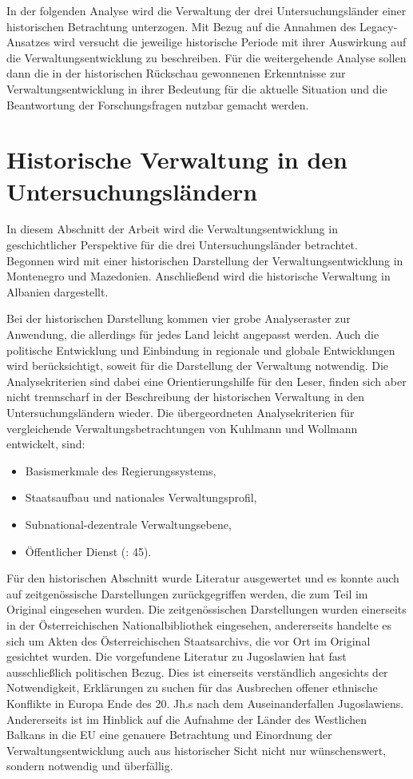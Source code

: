 In der folgenden Analyse wird die Verwaltung der drei Untersuchungsländer einer historischen Betrachtung unterzogen. Mit Bezug auf die Annahmen des Legacy-Ansatzes wird versucht die jeweilige historische Periode mit ihrer Auswirkung auf die Verwaltungsentwicklung zu beschreiben. Für die weitergehende Analyse sollen dann die in der historischen Rückschau gewonnenen Erkenntnisse zur Verwaltungsentwicklung in ihrer Bedeutung für die aktuelle Situation und die Beantwortung der Forschungsfragen nutzbar gemacht werden.

\section{ Historische Verwaltung in den Untersuchungsländern }
In diesem Abschnitt der Arbeit wird die Verwaltungsentwicklung in geschichtlicher Perspektive für die drei Untersuchungsländer betrachtet. Begonnen wird mit einer historischen Darstellung der Verwaltungsentwicklung in Montenegro und Mazedonien. Anschließend wird die historische Verwaltung in Albanien dargestellt. \par
Bei der historischen Darstellung kommen vier grobe Analyseraster zur Anwendung, die allerdings für jedes Land leicht angepasst werden. 
Auch die politische Entwicklung und Einbindung in regionale und globale Entwicklungen wird berücksichtigt, soweit für die Darstellung der Verwaltung notwendig. Die Analysekriterien sind dabei eine Orientierungshilfe für den Leser, finden sich aber nicht trennscharf in der Beschreibung der historischen Verwaltung in den Untersuchungsländern wieder. Die übergeordneten Analysekriterien für vergleichende Verwaltungsbetrachtungen von Kuhlmann und Wollmann entwickelt, sind: 
\begin{itemize} \itemsep1pt \parskip0pt 
\item Basismerkmale des Regierungssystems,
\item Staatsaufbau und nationales Verwaltungsprofil, 
\item Subnational-dezentrale Verwaltungsebene,
\item Öffentlicher Dienst (\cite{kuhwol}: 45).
\end{itemize}
Für den historischen Abschnitt wurde Literatur ausgewertet und es konnte auch auf zeitgenössische Darstellungen zurückgegriffen werden, die zum Teil im Original eingesehen wurden. Die zeitgenössischen Darstellungen wurden einerseits in der Österreichischen Nationalbibliothek eingesehen, andererseits handelte es sich um Akten des Österreichischen Staatsarchivs, die vor Ort im Original gesichtet wurden. Die vorgefundene Literatur zu Jugoslawien hat fast ausschließlich politischen Bezug. Dies ist einerseits verständlich angesichts der Notwendigkeit, Erklärungen zu suchen für das Ausbrechen offener ethnische Konflikte in Europa Ende des 20. Jh.s nach dem Auseinanderfallen Jugoslawiens. Andererseits ist im Hinblick auf die Aufnahme der Länder des Westlichen Balkans in die EU eine genauere Betrachtung und Einordnung der Verwaltungsentwicklung auch aus historischer Sicht nicht nur wünschenswert, sondern notwendig und überfällig. 

